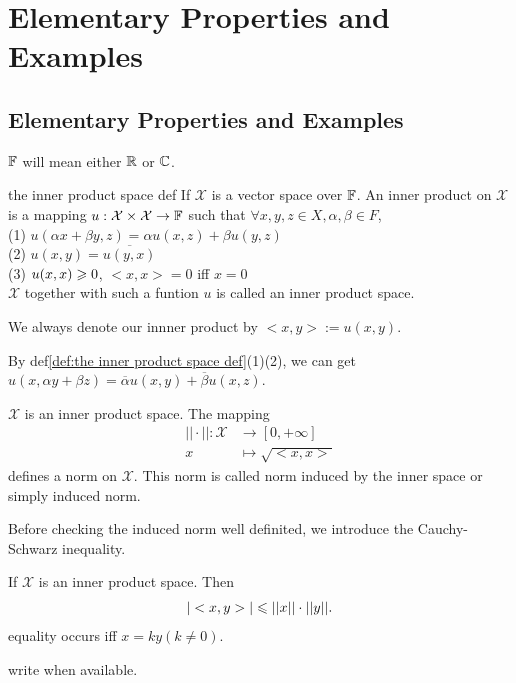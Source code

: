 \chapter{Elementary Properties and Examples}\label{chp:1_1}
\section{Elementary Properties and Examples}
\begin{remark}
    $\mathbb{F}$ will mean either $\mathbb{R}$ or $\mathbb{C}$.
\end{remark}

\begin{definition}{}{the inner product space def}
    If $\mathcal{X}$ is a vector space over $\mathbb{F}$. An inner product on $\mathcal{X}$ is a mapping $u:\mathcal{X}\times \mathcal{X}\rightarrow \mathbb{F}$ 
    such that $\forall x,y,z\in X,\alpha,\beta \in F$,\\
    (1) $u(\alpha x+\beta y,z)=\alpha u(x,z)+\beta u(y,z)$\\
    (2) $u(x,y)=\overline{u(y,x)}$\\
    (3) $u(x,x)\geqslant 0$,  $<x,x>=0$ iff $x=0$\\
    $\mathcal{X}$ together with such a funtion $u$ is called an inner product space.
\end{definition}

\begin{remark}
    We always denote our innner product by $<x,y>:=u(x,y)$. 
\end{remark}
\begin{remark}
    By def\ref{def:the inner product space def}(1)(2), we can get $u(x,\alpha y + \beta z)=\overline{\alpha} u(x,y) +\overline{\beta} u(x,z)$.
\end{remark}

\begin{definition}{}{}
    $\mathcal{X}$ is an inner product space.
    The mapping
    \begin{align*}
        ||\cdot||: \mathcal{X}&\rightarrow [0,+\infty]\\
        x &\mapsto \sqrt{<x,x>}
    \end{align*} 
    defines a norm on $\mathcal{X}$. This norm is called norm induced by the inner space or simply induced norm.
\end{definition}

Before checking the induced norm well definited, we introduce the Cauchy-Schwarz inequality.

\begin{theorem}{}{}
    If $\mathcal{X}$ is an inner product space. Then
    \begin{align*}
        |<x,y>|\leqslant ||x||\cdot ||y||.
    \end{align*}
    equality occurs iff $x=ky(k\neq 0)$.
\end{theorem}
\begin{proofsolution}
    write when available.
\end{proofsolution}

